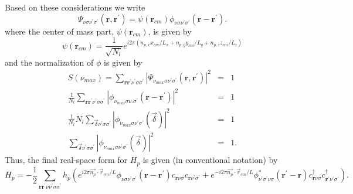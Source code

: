 Based on these considerations we write
\begin{equation}
\Psi_{\nu\sigma\nu^{\prime}\sigma^{\prime}}(\mathbf{r},\mathbf{r}^{\prime}) = 
\psi\left(\mathbf{r}_{cm}\right) 
\phi_{\nu\sigma\nu^{\prime}\sigma^{\prime}}(\mathbf{r} - \mathbf{r}^{\prime}).
\end{equation}
where the center of mass part, $\psi(\mathbf{r}_{cm})$, is given
by
\begin{equation}
\psi(\mathbf{r}_{cm}) = 
\frac{1}{\sqrt{N_l}}e^{i 2 \pi ( n_{p,x} x_{cm} / L_x + n_{p,y} y_{cm}/L_y + 
n_{p,z} z_{cm}/L_z)}
\end{equation}
and the normalization of $\phi$ is given by
\begin{eqnarray}
S(\nu_{max}) = \sum_{\mathbf{r}\mathbf{r}^{\prime}\nu^{\prime}\sigma\sigma^{\prime}} 
|\Psi_{\nu_{max}\sigma\nu^{\prime}\sigma^{\prime}}(\mathbf{r},\mathbf{r}^{\prime})|^2 
& = & 1 \\
\frac{1}{N_l}
\sum_{\mathbf{r}\mathbf{r}^{\prime}\nu^{\prime}\sigma\sigma^{\prime}} 
|\phi_{\nu_{max}\sigma\nu_{\prime}\sigma^{\prime}}(\mathbf{r} - \mathbf{r}^{\prime}) |^2 
& = & 1\\
\frac{1}{N_l} N_l \sum_{\vec{\delta}\nu^{\prime}\sigma\sigma^{\prime}} 
|\phi_{\nu_{max}\sigma\nu^{\prime}\sigma^{\prime}}(\vec{\delta})|^2 & = & 
1 \\
\sum_{\vec{\delta}\nu^{\prime}\sigma\sigma^{\prime}} 
|\phi_{\nu_{max}\sigma\nu^{\prime}\sigma^{\prime}}(\vec{\delta}) |^2 & = & 1.
\end{eqnarray}
Thus, the final real-space form for $H_p$ is given (in conventional
notation) by
\begin{equation}
\label{H_p_real}
H_p = -\frac{1}{2}
\sum_{\mathbf{r}\mathbf{r}^{\prime}\nu\nu^{\prime}\sigma\sigma^{\prime}} 
 h_p \left(e^{i 2 \pi \vec{n_p}\cdot \vec{r}_{cm}/L} 
\phi_{\nu\sigma\nu^{\prime}\sigma^{\prime}}(\mathbf{r} -
\mathbf{r}^{\prime}) c_{\mathbf{r}\nu\sigma} c_{\mathbf{r}\nu^{\prime}\sigma^{\prime}}
+e^{-i 2 \pi \vec{n_p}\cdot \vec{r}_{cm}/L} 
\phi_{\nu^{\prime}\sigma^{\prime}\nu\sigma}^*(\mathbf{r}^{\prime} -
\mathbf{r})c^{\dagger}_{\mathbf{r}\nu\sigma}
c^{\dagger}_{\mathbf{r}^{\prime}\nu^{\prime}\sigma^{\prime}} \right).
\end{equation}

